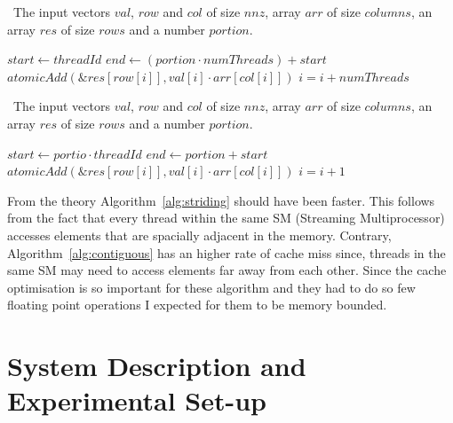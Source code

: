 \documentclass[conference]{IEEEtran}
\begin{document}
\begin{algorithm}[h]
\caption{SpMV algorithm with striding}
\algorithmicrequire~The input vectors \(val\), \(row\) and \(col\) of size \(nnz\), array \(arr\) of size \(columns\), an array \(res\) of size \(rows\) and a number \(portion\).
\begin{algorithmic}[1]
  \State\(start\gets threadId\)
  \State\(end\gets(portion\cdot numThreads) + start\)
    \State\(atomicAdd(\&res[row[i]], val[i] \cdot arr[col[i]])\)
    \State\(i = i + numThreads\)
  \EndWhile%
\EndProcedure%
\end{algorithmic}
\label{alg:striding}
\end{algorithm}

\begin{algorithm}[h]
\caption{SpMV algorithm with contiguous chunk}
\algorithmicrequire~The input vectors \(val\), \(row\) and \(col\) of size \(nnz\), array \(arr\) of size \(columns\), an array \(res\) of size \(rows\) and a number \(portion\).
\begin{algorithmic}[1]
  \State\(start\gets portio\cdot threadId\)
  \State\(end\gets portion + start\)
    \State\(atomicAdd(\&res[row[i]], val[i] \cdot arr[col[i]])\)
    \State\(i = i + 1\)
  \EndWhile%
\EndProcedure%
\end{algorithmic}
\label{alg:contiguous}
\end{algorithm}

From the theory Algorithm~\ref{alg:striding} should have been faster. This follows from the fact that every thread within the same SM (Streaming Multiprocessor) accesses elements that are spacially adjacent in the memory. Contrary, Algorithm~\ref{alg:contiguous} has an higher rate of cache miss since, threads in the same SM may need to access elements far away from each other. Since the cache optimisation is so important for these algorithm and they had to do so few floating point operations I expected for them to be memory bounded.

\section{System Description and Experimental Set-up}

\end{document}
